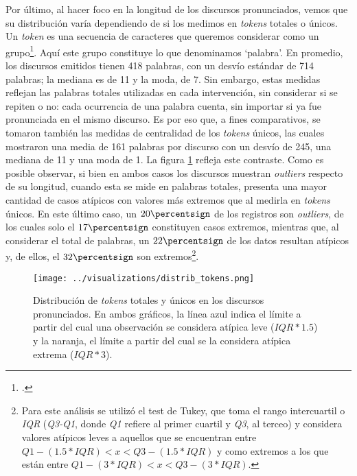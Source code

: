 Por último, al hacer foco en la longitud de los discursos pronunciados, vemos que su
distribución varía dependiendo de si los medimos en \textit{tokens} totales o únicos.
Un \textit{token} es una secuencia de caracteres que queremos considerar como un
grupo\footnote{\citet*{bird2009natural}.}. Aquí este grupo constituye lo que denominamos
`palabra'. En promedio, los discursos emitidos tienen 418 palabras, con un desvío
estándar de 714 palabras; la mediana es de 11 y la moda, de 7. Sin embargo, estas medidas
reflejan las palabras totales utilizadas en cada intervención, sin considerar si se repiten
o no: cada ocurrencia de una palabra cuenta, sin importar si ya fue pronunciada en el mismo
discurso. Es por eso que, a fines comparativos, se tomaron también las medidas de centralidad
de los \textit{tokens} únicos, las cuales mostraron una media de 161 palabras por discurso
con un desvío de 245, una mediana de 11 y una moda de 1. La figura \ref{fig-distrib-tokens}
refleja este contraste. Como es posible observar, si bien en ambos casos los discursos
muestran \textit{outliers} respecto de su longitud, cuando esta se mide en palabras
totales, presenta una mayor cantidad de casos atípicos con valores más extremos que
al medirla en \textit{tokens} únicos. En este último caso, un
$20\percentsign$ de los registros son \textit{outliers}, de los cuales solo el
$17\percentsign$ constituyen casos extremos, mientras que, al considerar
el total de palabras, un $22\percentsign$ de los datos resultan atípicos y,
de ellos, el $32\percentsign$ son extremos\footnote{Para este análisis se utilizó el
test de Tukey, que toma el rango intercuartil o \textit{IQR} (\textit{Q3-Q1}, donde
\textit{Q1} refiere al primer cuartil y \textit{Q3}, al terceo) y considera
valores atípicos leves a aquellos que se encuentran entre
$Q1 - (1.5 * IQR) < x < Q3 - (1.5 * IQR)$ y como extremos a los que están entre
$Q1 - (3 * IQR) < x < Q3 - (3 * IQR)$.}.

\begin{figure}[h!]%
    \centering%
    \texttt{[image: ../visualizations/distrib\_tokens.png]}%
    \caption{Distribución de \textit{tokens} totales y únicos en los discursos pronunciados. En ambos gráficos,
    la línea azul indica el límite a partir del cual una observación se considera atípica leve
    ($IQR*1.5$) y la naranja, el límite a partir del cual se la considera atípica extrema ($IQR*3$).}%
    \label{fig-distrib-tokens}%
\end{figure}%


